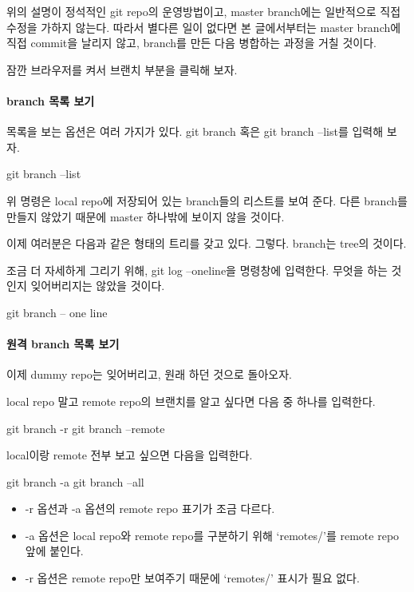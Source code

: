 \documentclass[12pt, a4paper, oneside]{book}
\begin{document}
위의 설명이 정석적인 git repo의 운영방법이고, 
master branch에는 일반적으로 직접 수정을 가하지 않는다. 
따라서 별다른 일이 없다면 본 글에서부터는 master branch에 직접 commit을 날리지 않고, 
branch를 만든 다음 병합하는 과정을 거칠 것이다.

잠깐 브라우저를 켜서 브랜치 부분을 클릭해 보자.

\paragraph{branch 목록 보기}

목록을 보는 옵션은 여러 가지가 있다. git branch 혹은 git branch --list를 입력해 보자.

		\begin{tcolorbox}
 		git branch  --list
		\end{tcolorbox}

위 명령은 local repo에 저장되어 있는 branch들의 리스트를 보여 준다. 
다른 branch를 만들지 않았기 때문에 master 하나밖에 보이지 않을 것이다.

이제 여러분은 다음과 같은 형태의 트리를 갖고 있다.
그렇다. branch는 tree의 것이다.

조금 더 자세하게 그리기 위해, git log --oneline을 명령창에 입력한다. 
무엇을 하는 것인지 잊어버리지는 않았을 것이다.

		\begin{tcolorbox}
 		git branch  -- one line
		\end{tcolorbox}


\paragraph{원격 branch 목록 보기}
이제 dummy repo는 잊어버리고, 원래 하던 것으로 돌아오자.

local repo 말고 remote repo의 브랜치를 알고 싶다면 다음 중 하나를 입력한다.

		\begin{tcolorbox}
		git branch -r
		git branch –remote
		\end{tcolorbox}

local이랑 remote 전부 보고 싶으면 다음을 입력한다.

		\begin{tcolorbox}
		git branch -a
		git branch –all
		\end{tcolorbox}

		\begin{itemize}	[							leftmargin=6em]
		\item 	-r 옵션과 -a 옵션의 remote repo 표기가 조금 다르다.
		\item -a 옵션은 local repo와 remote repo를 구분하기 위해 ‘remotes/’를 remote repo 앞에 붙인다.
		\item -r 옵션은 remote repo만 보여주기 때문에 ‘remotes/’ 표시가 필요 없다.
		\end{itemize}
\end{document}
